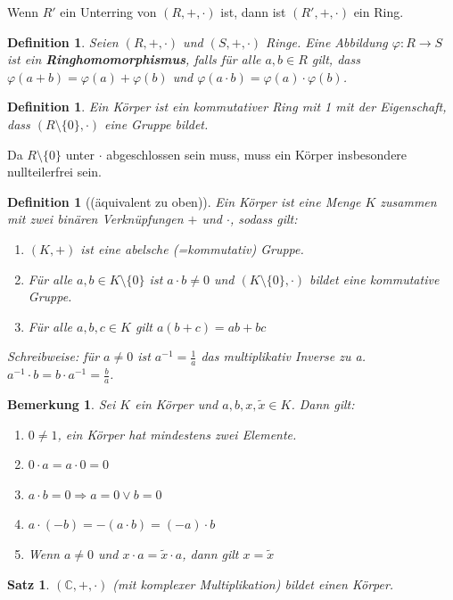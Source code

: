 \documentclass[12pt,a4paper]{article}
\theoremstyle{plain}
\newtheorem{Satz}[Theorem]{Satz}
\newtheorem{Definition}[Theorem]{Definition}
\newtheorem{Bemerkung}[Theorem]{Bemerkung}
\newcommand{\herv}[1]{{\emph{\textbf{#1}}}}
\newcommand{\C}{\mathbb{C}}
\numberwithin{equation}{section}
\begin{document}
Wenn $R'$ ein Unterring von $(R,+,\cdot)$ ist, dann ist $(R',+,\cdot)$ ein Ring.
\begin{Definition}
Seien $(R,+,\cdot)$ und $(S,+,\cdot)$ Ringe. Eine Abbildung $\varphi: R\rightarrow S$ ist ein \herv{Ringhomomorphismus}, falls für alle $a,b\in R$ gilt, dass $\varphi(a+b)=\varphi(a)+\varphi(b)$ und $\varphi(a\cdot b)=\varphi(a)\cdot \varphi(b)$.
\end{Definition}
\begin{Definition}
Ein Körper ist ein kommutativer Ring mit 1 mit der Eigenschaft, dass $(R\setminus\{0\},\cdot)$ eine Gruppe bildet.
\end{Definition}
Da $R\setminus\{0\}$ unter $\cdot$ abgeschlossen sein muss, muss ein Körper insbesondere nullteilerfrei sein.
\begin{Definition}[(äquivalent zu oben)]
Ein Körper ist eine Menge $K$ zusammen mit zwei binären Verknüpfungen $+$ und $\cdot$, sodass gilt:
\begin{enumerate}
\renewcommand{\labelenumi}{\emph{(K\arabic{enumi})}}
\item $(K,+)$ ist eine abelsche (=kommutativ) Gruppe.
\item Für alle $a,b\in K\setminus\{0\}$ ist $a\cdot b\neq 0$ und $(K\setminus\{0\},\cdot)$ bildet eine kommutative Gruppe.
\item Für alle $a,b,c\in K$ gilt $a(b+c)=ab+bc$
\end{enumerate}
Schreibweise: für $a\neq 0$ ist $a^{-1}=\frac{1}{a}$ das multiplikativ Inverse zu a. $a^{-1}\cdot b=b\cdot a^{-1}=\frac{b}{a}$.
\end{Definition}
\begin{Bemerkung}
Sei $K$ ein Körper und $a,b,x,\tilde{x}\in K$. Dann gilt:
\begin{enumerate}
\renewcommand{\labelenumi}{(\alph{enumi})}
\item $0\neq 1$, ein Körper hat mindestens zwei Elemente.
\item $0\cdot a=a\cdot 0=0$
\item $a\cdot b=0 \Rightarrow a=0 \vee b=0$
\item $a\cdot (-b)=-(a\cdot b)=(-a)\cdot b$
\item Wenn $a\neq 0$ und $x\cdot a=\tilde{x}\cdot a$, dann gilt $x=\tilde{x}$
\end{enumerate}
\end{Bemerkung}
\begin{Satz}
$(\C,+,\cdot)$ (mit komplexer Multiplikation) bildet einen Körper.
\end{Satz}
\end{document}
